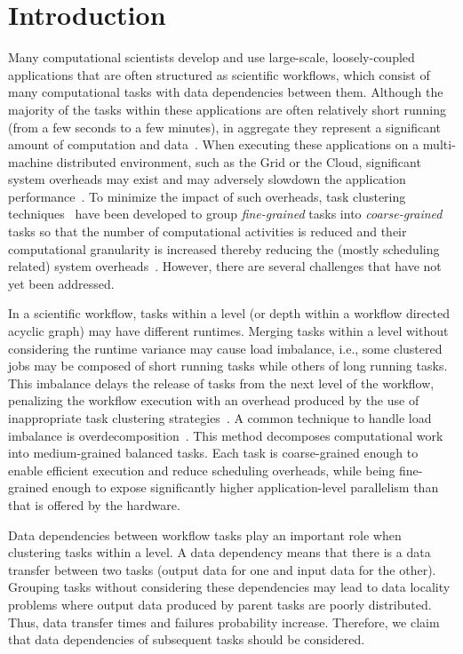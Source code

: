 
\section{Introduction}
\label{intro}
Many computational scientists develop and use large-scale, loosely-coupled applications that are often structured as scientific workflows, which consist of many computational tasks with data dependencies between them. Although the majority of the tasks within these applications are often relatively short running (from a few seconds to a few minutes), in aggregate they represent a significant amount of computation and data~\cite{daSilva:2013:TFO:2534248.2534254,Juve2013}. When executing these applications on a multi-machine distributed environment, such as the Grid or the Cloud, significant system overheads may exist and may adversely slowdown the application performance~\cite{Chen2011}. To minimize the impact of such overheads, task clustering techniques~\cite{Muthuvelu:2005:DJG:1082290.1082297,4493929,Muthuvelu2010,Muthuvelu2013170,keat-2006,ang-2009,Liu2009,Singh:2008:WTC:1341811.1341822,Ferreira-granularity-2013} have been developed to group \emph{fine-grained} tasks into \emph{coarse-grained} tasks so that the number of computational activities is reduced and their computational granularity is increased thereby reducing the (mostly scheduling related) system overheads~\cite{Chen2011}.
However, there are several challenges that have not yet been addressed.

In a scientific workflow, tasks within a level (or depth within a workflow directed acyclic graph) may have different runtimes. Merging tasks within a level without considering the runtime variance may cause load imbalance, i.e., some clustered jobs may be composed of short running tasks while others of long running tasks. This imbalance delays the release of tasks from the next level of the workflow, penalizing the workflow execution with an overhead produced by the use of inappropriate task clustering strategies~\cite{Chen2013}.
A common technique to handle load imbalance is overdecomposition~\cite{Lifflander}.
This method decomposes computational work into medium-grained balanced tasks. Each task is coarse-grained enough to enable efficient execution and reduce scheduling overheads, while being fine-grained enough to expose significantly higher application-level parallelism than that is offered by the hardware. 

Data dependencies between workflow tasks play an important role when clustering tasks within a level. A data dependency means that there is a data transfer between two tasks (output data for one and input data for the other). Grouping tasks without considering these dependencies may lead to data locality problems where output data produced by parent tasks are poorly distributed. Thus, data transfer times and failures probability increase.
Therefore, we claim that data dependencies of subsequent tasks should be considered.

